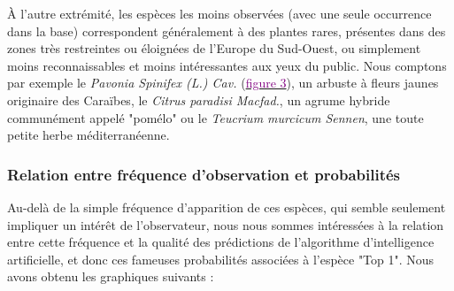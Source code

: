 \documentclass[a4paper,12pt]{article}
\begin{document}
\vspace{0.2cm}

À l'autre extrémité, les espèces les moins observées (avec une seule occurrence dans la base) correspondent généralement à des plantes rares, présentes dans des zones très restreintes ou éloignées de l'Europe du Sud-Ouest, ou simplement moins reconnaissables et moins intéressantes aux yeux du public. Nous comptons par exemple le \textit{Pavonia Spinifex (L.) Cav.} (\hyperref[fig:prunus]{\textcolor{purple}{figure 3}}), un arbuste à fleurs jaunes originaire des Caraïbes, le \textit{Citrus paradisi Macfad.}, un agrume hybride communément appelé "pomélo" ou le \textit{Teucrium murcicum Sennen}, une toute petite herbe méditerranéenne.

\subsubsection{Relation entre fréquence d'observation et probabilités}

Au-delà de la simple fréquence d'apparition de ces espèces, qui semble seulement impliquer un intérêt de l'observateur, nous nous sommes intéressées à la relation entre cette fréquence et la qualité des prédictions de l'algorithme d'intelligence artificielle, et donc ces fameuses probabilités associées à l'espèce "Top 1".  Nous avons obtenu les graphiques suivants :
\end{document}
